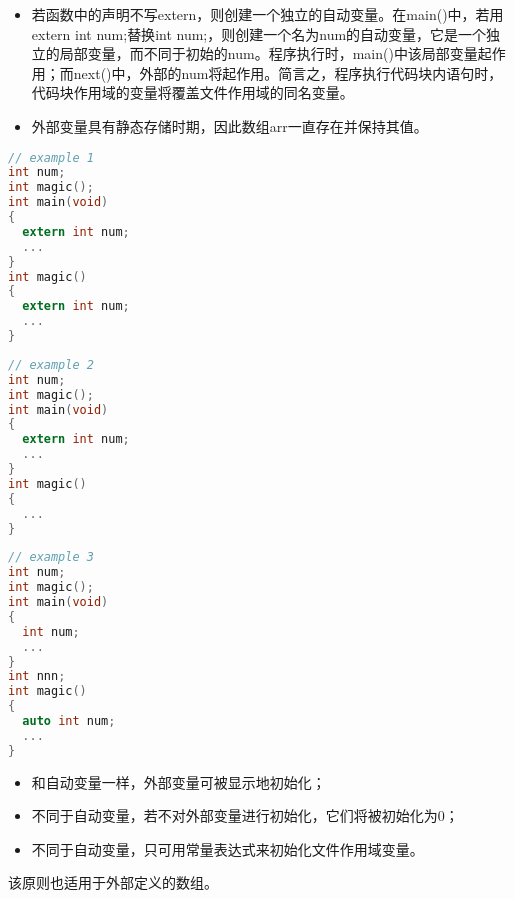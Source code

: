 \begin{frame}[fragile]\ft{\subsecname}
  \begin{itemize}
  \item 若函数中的声明不写extern，则创建一个独立的自动变量。在{\tf main()}中，若用{\tf extern int num;}替换{\tf int num;}，则创建一个名为{\tf num}的自动变量，它是一个独立的局部变量，而不同于初始的{num}。程序执行时，{\tf main()}中该局部变量起作用；而{\tf next()}中，外部的{\tf num}将起作用。简言之，\textcolor{acolor1}{程序执行代码块内语句时，代码块作用域的变量将覆盖文件作用域的同名变量。}
  \item 外部变量具有静态存储时期，因此数组{\tf arr}一直存在并保持其值。
\end{itemize}
\end{frame}

\begin{frame}[fragile]\ft{\subsecname}
  \begin{lstlisting}[language=c,frame=single]
// example 1
int num;
int magic();
int main(void)
{
  extern int num;
  ...
}
int magic()
{
  extern int num;
  ...
}  
  \end{lstlisting}
\end{frame}

\begin{frame}[fragile]\ft{\subsecname}
  \begin{lstlisting}[language=c,frame=single]
// example 2
int num;
int magic();
int main(void)
{
  extern int num;
  ...
}
int magic()
{
  ...
}  
  \end{lstlisting}
\end{frame}

\begin{frame}[fragile]\ft{\subsecname}
  \begin{lstlisting}[language=c,frame=single]
// example 3
int num;
int magic();
int main(void)
{
  int num;
  ...
}
int nnn;
int magic()
{
  auto int num;
  ...
}  
  \end{lstlisting}
\end{frame}

\begin{frame}[fragile]

\begin{itemize}
        \item 和自动变量一样，外部变量可被显示地初始化；
        \item 不同于自动变量，若不对外部变量进行初始化，它们将被初始化为0；
        \item 不同于自动变量，只可用常量表达式来初始化文件作用域变量。
\end{itemize}

该原则也适用于外部定义的数组。
\end{frame}

